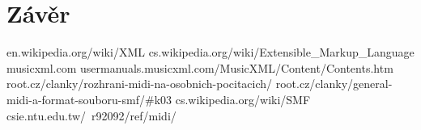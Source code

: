 \documentclass[12pt,a4paper,titlepage]{article}
\begin{document}
\section{Závěr}
\begin{thebibliography}{10}
en.wikipedia.org/wiki/XML
cs.wikipedia.org/wiki/Extensible\_Markup\_Language
musicxml.com
usermanuals.musicxml.com/MusicXML/Content/Contents.htm
root.cz/clanky/rozhrani-midi-na-osobnich-pocitacich/
root.cz/clanky/general-midi-a-format-souboru-smf/\#k03
cs.wikipedia.org/wiki/SMF
csie.ntu.edu.tw/~r92092/ref/midi/
\end{thebibliography}
\end{document}
